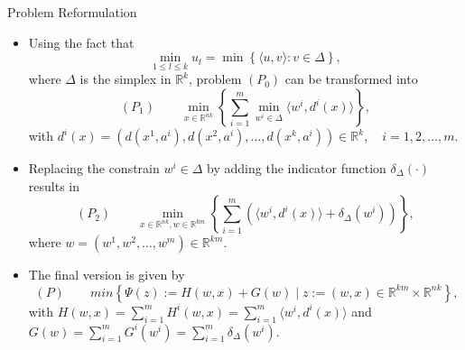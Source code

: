 \documentclass[9pt,handout]{beamer} %
\newcommand{\R}{\mathbb{R}} %
\begin{document}
    \begin{frame}{Problem Reformulation}
	    \begin{itemize}[<+->]
	    	\item Using the fact that
				\begin{equation*}
					\min\limits_{1 \leq l \leq k} u_l = \min \left\lbrace \langle u,v \rangle : v \in \Delta \right\rbrace ,
				\end{equation*}
				where $\Delta$ is the simplex in $\R^k$, problem $(P_0)$ can be transformed into
				\begin{equation*}
					(P_1) \qquad \min\limits_{x \in \R^{nk}} \left\{ \sum\limits_{i=1}^{m} \min\limits_{w^i \in \Delta} \langle w^i , d^i(x) \rangle \right\},
				\end{equation*}
				with $d^{i}(x) = (d(x^1,a^i), d(x^2,a^i), \ldots , d(x^k,a^i)) \in \mathbb{R}^k, \quad i=1, 2, \ldots , m$.
			\item Replacing the constrain $w^i \in \Delta$ by adding the indicator function $\delta_{\Delta}(\cdot)$ results in
				\begin{equation*}
					(P_2) \qquad \min\limits_{x \in \mathbb{R}^{nk} , w \in \mathbb{R}^{km}} \left\lbrace \sum\limits_{i=1}^{m} \left( \langle w^i , d^i(x) \rangle + \delta_{\Delta}(w^i) \right) \right\rbrace,
				\end{equation*}
				where $w = (w^1, w^2, \ldots , w^m) \in \R^{km}$.
			\item The final version is given by
				\begin{equation*}
				\	(P) \qquad min \left\lbrace \Psi(z) := H(w,x) + G(w) \mid z := (w,x) \in \R^{km} \times \R^{nk} \right\rbrace, 
				\end{equation*}
				with $H(w,x) = \sum\limits_{i=1}^{m} H^i(w,x) = \sum\limits_{i=1}^{m} \langle w^i , d^i(x) \rangle$ and $G(w) = \sum\limits_{i=1}^{m} G^i(w^i) = \sum\limits_{i=1}^{m} \delta_{\Delta}(w^i).$			
		\end{itemize}
    \end{frame}
\end{document}
